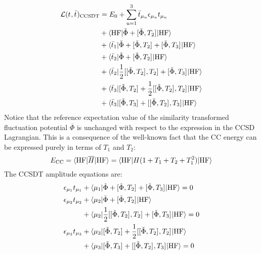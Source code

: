 \begin{equation}\label{eq:ccsdt-lagrangian}
 \begin{aligned}
 \mathcal{L}(t_{}, \bar{t}_{})_\mathrm{CCSDT}
&=
 E_0
 + \sum_{u=1}^{3}\bar{t}_{\mu_u}\epsilon_{\mu_u}t_{\mu_u} \\
 &+ \braket{\mathrm{HF} | \check{\Phi} + [ \check{\Phi}, T_2 ]^{} | \mathrm{HF}} \\
 &+ \braket{\bar{t}_{1} | \check{\Phi} + [ \check{\Phi}, T_2 ]^{} + [ \check{\Phi}, T_3 ]^{} | \mathrm{HF}} \\
 &+ \braket{\bar{t}_{2} | \check{\Phi} + [ \check{\Phi}, T_2 ]^{} | \mathrm{HF}} \\
 &+ \braket{\bar{t}_{2} |
   \frac{1}{2}[ [ \check{\Phi}, T_2 ]^{}, T_2 ]^{} + [ \check{\Phi}, T_3 ]^{} | \mathrm{HF}} \\
 &+ \braket{\bar{t}_{3} | [ \check{\Phi}, T_2 ]^{}
   + \frac{1}{2}[ [ \check{\Phi}, T_2 ]^{}, T_2 ]^{}
   | \mathrm{HF}} \\
 &+ \braket{\bar{t}_{3} | [ \check{\Phi}, T_3 ]^{} + [ [ \check{\Phi}, T_2 ]^{}, T_3 ]^{}
   | \mathrm{HF}}
  \end{aligned}
\end{equation}
Notice that the reference expectation value of the similarity transformed
fluctuation potential $\overline{\Phi}$ is unchanged with respect to the
expression in the \acrshort{CCSD} Lagrangian.
This is a consequence of the well-known fact that the \acrshort{CC} energy can
be expressed purely in terms of $T_1$ and $T_2$:
\begin{equation}
E_\mathrm{CC} = \braket{\mathrm{HF} | \overline{H} | \mathrm{HF}}
=
\braket{\mathrm{HF} | H(1 + T_1 + T_2 + T_1^2) | \mathrm{HF}}
\end{equation}
The \acrshort{CCSDT} amplitude equations are:
\begin{subequations}\label{eq:ccsdt-amplitudes}
  \begin{align}
   \epsilon_{\mu_1}t_{\mu_1} &+ \braket{\mu_1 |
   \check{\Phi} + [ \check{\Phi}, T_2 ]^{} + [ \check{\Phi}, T_3 ]^{}
   | \mathrm{HF}}
             = 0 \label{eq:ccsdt-singles-amplitudes}\\
   \epsilon_{\mu_2}t_{\mu_2}
   &+ \braket{\mu_2 |
   \check{\Phi} + [ \check{\Phi}, T_2 ]^{}
   | \mathrm{HF}} \nonumber \\
   &+ \braket{\mu_2 |
    \frac{1}{2}[ [ \check{\Phi}, T_2 ]^{}, T_2 ]^{} + [ \check{\Phi}, T_3 ]^{}
   | \mathrm{HF}}
             = 0 \label{eq:ccsdt-doubles-amplitudes} \\
   \epsilon_{\mu_3}t_{\mu_3} &+
   \braket{\mu_3 |
   [ \check{\Phi}, T_2 ]^{}
   + \frac{1}{2}[ [ \check{\Phi}, T_2 ]^{}, T_2 ]^{}
   | \mathrm{HF}} \nonumber \\
   &+ \braket{\mu_3 |
     [ \check{\Phi}, T_3 ]^{}
   + [ [ \check{\Phi}, T_2 ]^{}, T_3 ]^{}
   | \mathrm{HF}}
             = 0 \label{eq:ccsdt-triples-amplitudes}
  \end{align}
\end{subequations}
